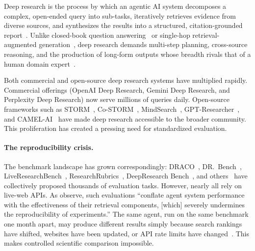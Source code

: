 \documentclass{article}
\begin{document}
Deep research is the process by which an agentic AI system decomposes a complex, open-ended query into sub-tasks, iteratively retrieves evidence from diverse sources, and synthesizes the results into a structured, citation-grounded report~\citep{draco2026,drbench2026}. Unlike closed-book question answering~\citep{gaia2024,hle2025} or single-hop retrieval-augmented generation~\citep{frames2024,fanoutqa2024}, deep research demands multi-step planning, cross-source reasoning, and the production of long-form outputs whose breadth rivals that of a human domain expert~\citep{drsurvey2025}.

Both commercial and open-source deep research systems have multiplied rapidly. Commercial offerings (OpenAI Deep Research, Gemini Deep Research, and Perplexity Deep Research) now serve millions of queries daily. Open-source frameworks such as STORM~\citep{storm2024}, Co-STORM~\citep{costorm2024}, MindSearch~\citep{mindsearch2025}, GPT-Researcher~\citep{gptresearcher2024}, and CAMEL-AI~\citep{camelai2023} have made deep research accessible to the broader community. This proliferation has created a pressing need for standardized evaluation.

\paragraph{The reproducibility crisis.} The benchmark landscape has grown correspondingly: DRACO~\citep{draco2026}, DR.~Bench~\citep{drbench2026}, LiveResearchBench~\citep{liveresearchbench2026}, ResearchRubrics~\citep{researchrubrics2025}, DeepResearch Bench~\citep{drb2025}, and others~\citep{drb2_2026,mmdr2026,dr9k2026,reportbench2025,kdrbench2026} have collectively proposed thousands of evaluation tasks. However, nearly all rely on live-web APIs. As \citet{browsecomp_plus2025} observe, such evaluations ``conflate agent system performance with the effectiveness of their retrieval components, [which] severely undermines the reproducibility of experiments.'' The same agent, run on the same benchmark one month apart, may produce different results simply because search rankings have shifted, websites have been updated, or API rate limits have changed~\citep{deepresearchgym2025}. This makes controlled scientific comparison impossible.
\end{document}
